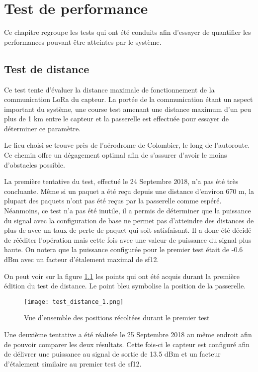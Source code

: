 
\chapter{Test de performance}

Ce chapitre regroupe les tests qui ont été conduits afin d'essayer de quantifier les performances pouvant être atteintes par le système.

\section{Test de distance}\label{ch:test_distance}

Ce test tente d'évaluer la distance maximale de fonctionnement de la communication LoRa du capteur. La portée de la communication étant un aspect important du système, une course test amenant une distance maximum d'un peu plus de 1 km entre le capteur et la passerelle est effectuée pour essayer de déterminer ce paramètre.

Le lieu choisi se trouve près de l'aérodrome de Colombier, le long de l'autoroute. Ce chemin offre un dégagement optimal afin de s'assurer d'avoir le moins d'obstacles possible.

La première tentative du test, effectué le 24 Septembre 2018, n'a pas été très concluante. Même si un paquet a été reçu depuis une distance d'environ 670 m, la plupart des paquets n'ont pas été reçus par la passerelle comme espéré. Néanmoins, ce test n'a pas été inutile, il a permis de déterminer que la puissance du signal avec la configuration de base ne permet pas d'atteindre des distances de plus de  avec un taux de perte de paquet qui soit satisfaisant. Il a donc été décidé de rééditer l'opération mais cette fois avec une valeur de puissance du signal plus haute. On notera que la puissance configurée pour le premier test était de -0.6 dBm avec un facteur d'étalement maximal de sf12.

On peut voir sur la figure \ref{fig:test_distance_11} les points qui ont été acquis durant la première édition du test de distance. Le point bleu symbolise la position de la passerelle.

\begin{figure}[htb]
\centering 
\texttt{[image: test\_distance\_1.png]} 
\caption{Vue d'ensemble des positions récoltées durant le premier test}
\label{fig:test_distance_11}
\end{figure}

Une deuxième tentative a été réalisée le 25 Septembre 2018 au même endroit afin de pouvoir comparer les deux résultats. Cette fois-ci le capteur est configuré afin de délivrer une puissance au signal de sortie de 13.5 dBm et un facteur d'étalement similaire au premier test de sf12.

